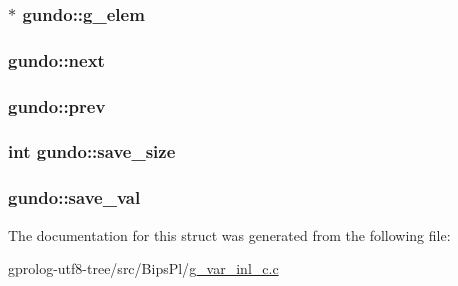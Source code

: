 \subsubsection[{\texorpdfstring{g\+\_\+elem}{g_elem}}]{$\ast$ gundo\+::g\+\_\+elem}\hypertarget{structgundo_a215f96c167e2bc2aa0902fd04fcce89b}{}\label{structgundo_a215f96c167e2bc2aa0902fd04fcce89b}
\subsubsection[{\texorpdfstring{next}{next}}]{ gundo\+::next}\hypertarget{structgundo_aa4dd84818a7b36f26b0f7524e850fec9}{}\label{structgundo_aa4dd84818a7b36f26b0f7524e850fec9}
\subsubsection[{\texorpdfstring{prev}{prev}}]{ gundo\+::prev}\hypertarget{structgundo_aeb28eb449ba2732d088663c85b986d75}{}\label{structgundo_aeb28eb449ba2732d088663c85b986d75}
\subsubsection[{\texorpdfstring{save\+\_\+size}{save_size}}]{\setlength{\rightskip}{0pt plus 5cm}int gundo\+::save\+\_\+size}\hypertarget{structgundo_a543c16d629efbb1e5e1260ef2f9438b5}{}\label{structgundo_a543c16d629efbb1e5e1260ef2f9438b5}
\subsubsection[{\texorpdfstring{save\+\_\+val}{save_val}}]{ gundo\+::save\+\_\+val}\hypertarget{structgundo_ad9b4b183b039fa879a47f9b4a400c742}{}\label{structgundo_ad9b4b183b039fa879a47f9b4a400c742}


The documentation for this struct was generated from the following file\+:\begin{DoxyCompactItemize}
\item 
gprolog-\/utf8-\/tree/src/\+Bips\+Pl/\hyperlink{g__var__inl__c_8c}{g\+\_\+var\+\_\+inl\+\_\+c.\+c}\end{DoxyCompactItemize}
